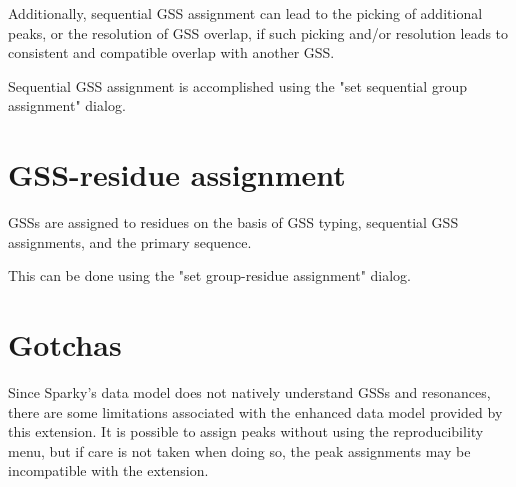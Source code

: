 \documentclass[11pt,a4paper]{article}
\begin{document}
Additionally, sequential GSS assignment can lead to the picking of additional
peaks, or the resolution of GSS overlap, if such picking and/or resolution
leads to consistent and compatible overlap with another GSS.

Sequential GSS assignment is accomplished using the "set sequential group
assignment" dialog.


\section{GSS-residue assignment}
GSSs are assigned to residues on the basis of GSS typing, sequential GSS
assignments, and the primary sequence.

This can be done using the "set group-residue assignment" dialog.


\section{Gotchas}
Since Sparky's data model does not natively understand GSSs and resonances,
there are some limitations associated with the enhanced data model provided
by this extension.  It is possible to assign peaks without using the 
reproducibility menu, but if care is not taken when doing so, the peak
assignments may be incompatible with the extension.



%

\end{document}
